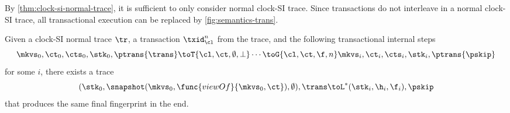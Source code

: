 By \cref{thm:clock-si-normal-trace}, it is sufficient to only consider normal clock-SI trace.
Since transactions do not interleave in a normal clock-SI trace,
all transactional execution can be replaced by \cref{fig:semantics-trans}.
\begin{theorem}[Simulation]
    \label{thm:clock-si-transaction-to-atomic}
    Given a clock-SI normal trace \( \tr \), a transaction \( \txid_\cl^n \) from the trace,
    and the following transactional internal steps
    \[
        \mkvs_0, \ct_0, \cts_0, \stk_0, \ptrans{\trans} \toT{\cl,\ct,\emptyset,\perp} \cdots  \toG{\cl,\ct,\f,n} \mkvs_i, \ct_i, \cts_i, \stk_i, \ptrans{\pskip}
    \]
    for some \( i \), there exists a trace
    \[
        (\stk_0, \snapshot(\mkvs_0,\func{viewOf}{\mkvs_0,\ct}), \emptyset), \trans \toL^*
        (\stk_i, \h_i, \f_i), \pskip
    \]
    that produces the same final fingerprint in the end.
\end{theorem}
